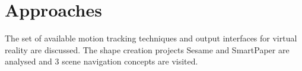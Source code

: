 
\section{Approaches}


The set of available motion tracking techniques and output interfaces for virtual reality are discussed.
The shape creation projects Sesame and SmartPaper are analysed and 3 scene navigation concepts are visited.








